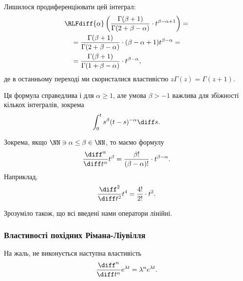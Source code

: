 Лишилося продиференціювати  цей інтеграл:
\begin{equation}
    \begin{aligned}
        & \RLFdiff{\alpha} \left( \frac{\Gamma(\beta + 1)}{\Gamma(2 + \beta - \alpha)} \cdot t^{\beta - \alpha + 1} \right) = \\
        &\quad = \frac{\Gamma(\beta + 1)}{\Gamma(2 + \beta - \alpha)} \cdot (\beta - \alpha + 1) t^{\beta - \alpha} = \\
        &\quad = \frac{\Gamma(\beta + 1)}{\Gamma(1 + \beta - \alpha)} \cdot t^{\beta - \alpha},
    \end{aligned}
\end{equation}
де в останньому переході ми скористалися властивістю $z \Gamma(z) = \Gamma(z + 1)$.

\begin{remark}
    Ця формула справедлива і для $\alpha \ge 1$, але умова $\beta > -1$ важлива для збіжності кількох інтегралів, зокрема
    \begin{equation}
        \int_0^t s^\beta (t- s)^{-\alpha} \diff s.
    \end{equation}
\end{remark}

\begin{example}
    Зокрема, якщо $\NN \ni \alpha \le \beta \in \NN$, то маємо формулу
    \begin{equation}
        \frac{\diff^\alpha}{\diff t^\alpha} t^\beta = \frac{\beta!}{(\beta - \alpha)!} \cdot t^{\beta - \alpha}.
    \end{equation}
    Наприклад,
    \begin{equation}
        \frac{\diff^2}{\diff t^2} t^4 = \frac{4!}{2!} \cdot t^2.
    \end{equation}
\end{example}

\begin{remark}
    Зрозуміло також, що всі введені нами оператори лінійні.
\end{remark}

\subsubsection{Властивості похідних Рімана-Ліувілля}

\begin{proposition}
    На жаль, не виконується наступна властивість
    \begin{equation}
        \frac{\diff^n}{\diff t^n} e^{\lambda t} = \lambda^n e^{\lambda t}.
    \end{equation}
\end{proposition}

